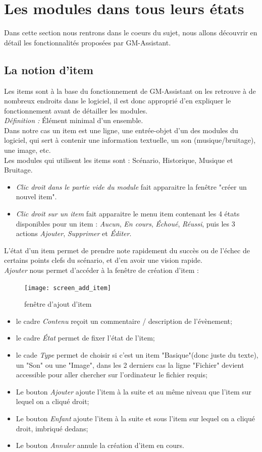 \documentclass[a4paper,12pt]{article}
\newcommand*{\GMA}{GM-Assistant\xspace}
\begin{document}
\section{Les modules dans tous leurs états}\label{details}
Dans cette section nous rentrons dans le coeurs du sujet, nous allons découvrir en détail les fonctionnalités proposées par \GMA.

\subsection{La notion d'item}\label{item}
Les items sont à la base du fonctionnement de \GMA on les retrouve à de nombreux endroits dans le logiciel, il est donc approprié d'en expliquer le fonctionnement avant de détailler les modules.
\\
\emph{Définition : } Élément minimal d'un ensemble.
\\
Dans notre cas un item est une ligne, une entrée-objet d'un des modules du logiciel, qui sert à contenir une information textuelle, un son (musique/bruitage), une image, etc.
\\
Les modules qui utilisent les items sont : Scénario, Historique, Musique et Bruitage.

\begin{itemize}
    \item\emph{Clic droit dans le partie vide du module} fait apparaitre la fenêtre "créer un nouvel item".
    \item\emph{Clic droit sur un item} fait apparaitre le menu item contenant les 4 états disponibles pour un item : \emph{Aucun}, \emph{En cours}, \emph{Échoué}, \emph{Réussi}, puis les 3 actions \emph{Ajouter}, \emph{Supprimer} et \emph{Éditer}.
\end{itemize}
L'état d'un item permet de prendre note rapidement du succès ou de l'échec de certains points clefs du scénario, et d'en avoir une vision rapide.\\

\emph{Ajouter} nous permet d'accéder à la fenêtre de création d'item :
\begin{figure}[h]
    \texttt{[image: screen\_add\_item]}
    \caption{fenêtre d'ajout d'item}
\end{figure}
\begin{itemize}
    \item le cadre \emph{Contenu} reçoit un commentaire / description de l'évènement;
    \item le cadre \emph{État} permet de fixer l'état de l'item;
    \item le cade \emph{Type} permet de choisir si c'est un item "Basique"(donc juste du texte), un "Son" ou une "Image", dans les 2 derniers cas la ligne "Fichier" devient accessible pour aller chercher sur l'ordinateur le fichier requis;
    \item Le bouton \emph{Ajouter} ajoute l'item à la suite et au même niveau que l'item sur lequel on a cliqué droit;
    \item Le bouton \emph{Enfant} ajoute l'item à la suite et sous l'item sur lequel on a cliqué droit, imbriqué dedans;
    \item Le bouton \emph{Annuler} annule la création d'item en cours.
\end{itemize}
\end{document}
